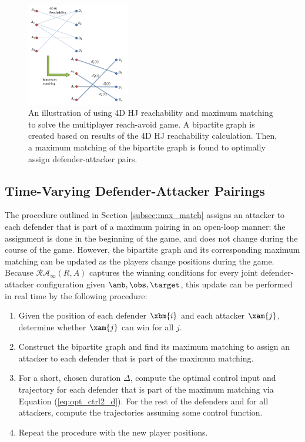 \begin{figure}[h]
\centering
\includegraphics[width=0.4\textwidth]{"fig/general procedure"}
\caption{An illustration of using 4D HJ reachability and maximum matching to solve the multiplayer reach-avoid game. A bipartite graph is created based on results of the 4D HJ reachability calculation. Then, a maximum matching of the bipartite graph is found to optimally assign defender-attacker pairs.}
\label{fig:general_procedure}
\end{figure}

\subsection{Time-Varying Defender-Attacker Pairings}
\label{subsec:tvarp}
The procedure outlined in Section \ref{subsec:max_match} assigns an attacker to each defender that is part of a maximum pairing in an open-loop manner: the assignment is done in the beginning of the game, and does not change during the course of the game. However, the bipartite graph and its corresponding maximum matching can be updated as the players change positions during the game. Because $\mathcal{RA}_\infty(R,A)$ captures the winning conditions for every joint defender-attacker configuration given $\amb,\obs,\target$, this update can be performed in real time by the following procedure:

\begin{enumerate}
\item Given the position of each defender $\xbm{i}$ and each attacker $\xam{j}$, determine whether $\xam{j}$ can win for all $j$. 
\item Construct the bipartite graph and find its maximum matching to assign an attacker to each defender that is part of the maximum matching.
\item For a short, chosen duration $\Delta$, compute the optimal control input and trajectory for each defender that is part of the maximum matching via Equation (\ref{eq:opt_ctrl2_d}). For the rest of the defenders and for all attackers, compute the trajectories assuming some control function.
\item Repeat the procedure with the new player positions.
\end{enumerate}

